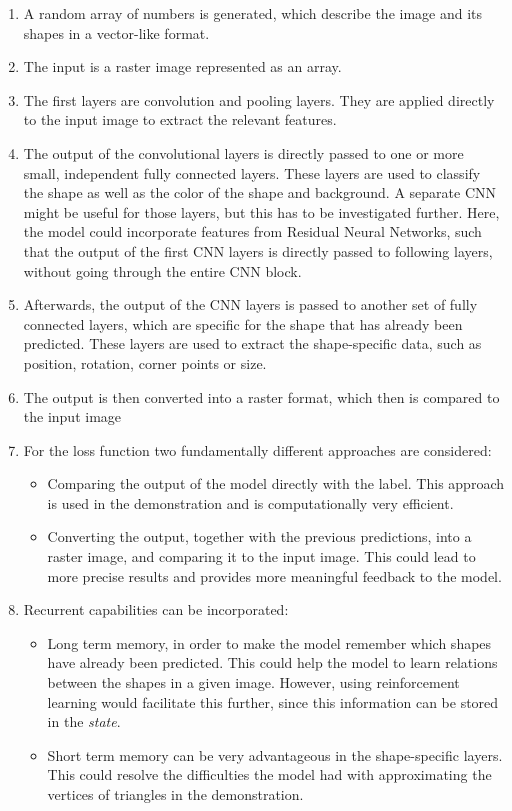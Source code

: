 \documentclass[12pt, a4paper, titlepage]{report}
\begin{document}
\begin{enumerate}[label=\Roman*.]
   \item A random array of numbers is generated, which describe the image and its shapes in a vector-like format.
   \item The input is a raster image represented as an array.
   \item The first layers are convolution and pooling layers. They are applied directly to the input image to extract the relevant features.
   \item The output of the convolutional layers is directly passed to one or more small, independent fully connected layers. These layers are used to classify the shape as well as the color of the shape and background. A separate CNN might be useful for those layers, but this has to be investigated further. Here, the model could incorporate features from Residual Neural Networks, such that the output of the first CNN layers is directly passed to following layers, without going through the entire CNN block.
   \item Afterwards, the output of the CNN layers is passed to another set of fully connected layers, which are specific for the shape that has already been predicted. These layers are used to extract the shape-specific data, such as position, rotation, corner points or size.
   \item The output is then converted into a raster format, which then is compared to the input image

   \item For the loss function two fundamentally different approaches are considered:
      \begin{itemize}
         \item Comparing the output of the model directly with the label. This approach is used in the demonstration and is computationally very efficient.
         \item Converting the output, together with the previous predictions, into a raster image, and comparing it to the input image. This could lead to more precise results and provides more meaningful feedback to the model.
      \end{itemize}

   \item Recurrent capabilities can be incorporated:
      \begin{itemize}
         \item Long term memory, in order to make the model remember which shapes have already been predicted. This could help the model to learn relations between the shapes in a given image. However, using reinforcement learning would facilitate this further, since this information can be stored in the \emph{state}.
         \item Short term memory can be very advantageous in the shape-specific layers. This could resolve the difficulties the model had with approximating the vertices of triangles in the demonstration.
      \end{itemize}
\end{enumerate}
\end{document}
